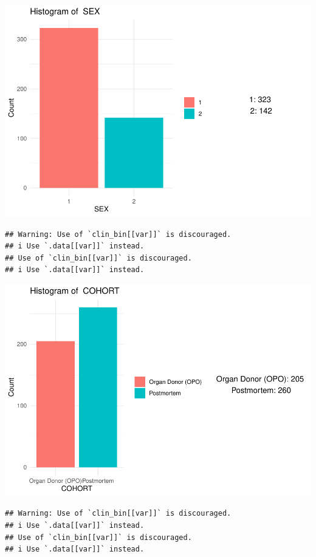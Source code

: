 \documentclass[
]{article}
\begin{document}
\includegraphics{Q1_markdown_files/figure-latex/unnamed-chunk-5-1.pdf}

\begin{verbatim}
## Warning: Use of `clin_bin[[var]]` is discouraged.
## i Use `.data[[var]]` instead.
## Use of `clin_bin[[var]]` is discouraged.
## i Use `.data[[var]]` instead.
\end{verbatim}

\includegraphics{Q1_markdown_files/figure-latex/unnamed-chunk-5-2.pdf}

\begin{verbatim}
## Warning: Use of `clin_bin[[var]]` is discouraged.
## i Use `.data[[var]]` instead.
## Use of `clin_bin[[var]]` is discouraged.
## i Use `.data[[var]]` instead.
\end{verbatim}
\end{document}
